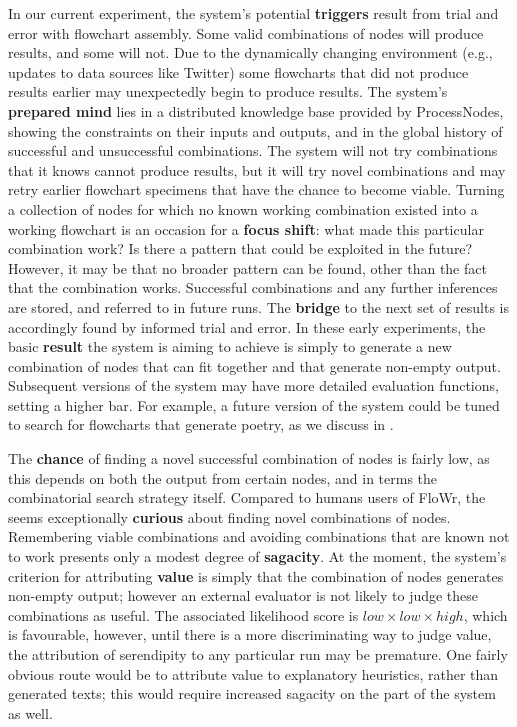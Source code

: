 In our current experiment, the system's potential \textbf{triggers}
result from trial and error with flowchart assembly.  Some valid
combinations of nodes will produce results, and some will not.  Due to
the dynamically changing environment (e.g., updates to data sources
like Twitter) some flowcharts that did not produce results earlier may
unexpectedly begin to produce results.
%
The system's \textbf{prepared mind} lies in a distributed knowledge
base provided by ProcessNodes, showing the constraints on their inputs
and outputs, and in the global history of successful and unsuccessful
combinations.
%
The system will not try combinations that it knows cannot produce
results, but it will try novel combinations and may retry earlier
flowchart specimens that have the chance to become viable.  Turning a
collection of nodes for which no known working combination existed
into a working flowchart is an occasion for a \textbf{focus shift}:
what made this particular combination work?  Is there a pattern that
could be exploited in the future?  However, it may be that no
broader pattern can be found, other than the fact that the combination works.
%
Successful combinations and any further inferences are stored, and
referred to in future runs.  The \textbf{bridge} to the next set of
results is accordingly found by informed trial and error.
%
In these early experiments, the basic \textbf{result} the system is
aiming to achieve is simply to generate a new combination of nodes that can fit together and that generate non-empty output.  Subsequent versions of the system may have more detailed evaluation functions, setting a higher bar.  For example, a future version of the system could be tuned to search for flowcharts that generate poetry, as we discuss in \cite{corneli2015computational}.

The \textbf{chance} of finding a novel successful combination of nodes
is fairly low, as this depends on both the output from certain nodes,
and in terms the combinatorial search strategy itself.  Compared to
humans users of {\sf FloWr}, the seems exceptionally \textbf{curious}
about finding novel combinations of nodes.  Remembering viable
combinations and avoiding combinations that are known not to work
presents only a modest degree of \textbf{sagacity}.  At the moment,
the system's criterion for attributing \textbf{value} is simply that
the combination of nodes generates non-empty output; however an
external evaluator is not likely to judge these combinations as
useful.  The associated likelihood score is
$\mathit{low}\times\mathit{low}\times\mathit{high}$, which
is favourable, however, until there is a
more discriminating way to judge value, the
attribution of serendipity to any particular run may
be premature.  One fairly obvious route would be to attribute
value to explanatory heuristics, rather than generated texts;
this would require increased sagacity on the part of the
system as well.

